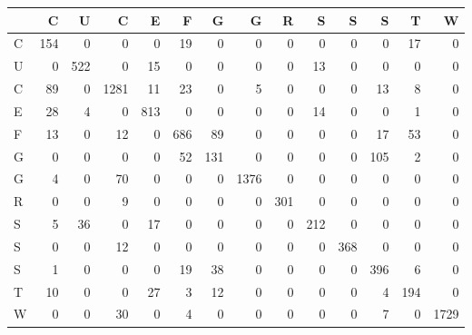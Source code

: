 \begin{tabular}{lrrrrrrrrrrrrr}
\toprule
{} &    C &    U &     C &    E &    F &    G &     G &    R &    S &    S &    S &    T &     W \\
\midrule
C &  154 &    0 &     0 &    0 &   19 &    0 &     0 &    0 &    0 &    0 &    0 &   17 &     0 \\
U &    0 &  522 &     0 &   15 &    0 &    0 &     0 &    0 &   13 &    0 &    0 &    0 &     0 \\
C &   89 &    0 &  1281 &   11 &   23 &    0 &     5 &    0 &    0 &    0 &   13 &    8 &     0 \\
E &   28 &    4 &     0 &  813 &    0 &    0 &     0 &    0 &   14 &    0 &    0 &    1 &     0 \\
F &   13 &    0 &    12 &    0 &  686 &   89 &     0 &    0 &    0 &    0 &   17 &   53 &     0 \\
G &    0 &    0 &     0 &    0 &   52 &  131 &     0 &    0 &    0 &    0 &  105 &    2 &     0 \\
G &    4 &    0 &    70 &    0 &    0 &    0 &  1376 &    0 &    0 &    0 &    0 &    0 &     0 \\
R &    0 &    0 &     9 &    0 &    0 &    0 &     0 &  301 &    0 &    0 &    0 &    0 &     0 \\
S &    5 &   36 &     0 &   17 &    0 &    0 &     0 &    0 &  212 &    0 &    0 &    0 &     0 \\
S &    0 &    0 &    12 &    0 &    0 &    0 &     0 &    0 &    0 &  368 &    0 &    0 &     0 \\
S &    1 &    0 &     0 &    0 &   19 &   38 &     0 &    0 &    0 &    0 &  396 &    6 &     0 \\
T &   10 &    0 &     0 &   27 &    3 &   12 &     0 &    0 &    0 &    0 &    4 &  194 &     0 \\
W &    0 &    0 &    30 &    0 &    4 &    0 &     0 &    0 &    0 &    0 &    7 &    0 &  1729 \\
\bottomrule
\end{tabular}
